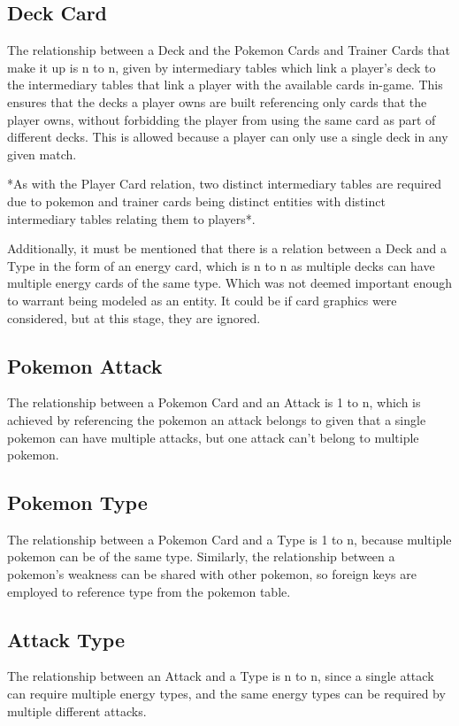 \documentclass{article}
\begin{document}
\subsection{Deck Card}

The relationship between a Deck and the 
Pokemon Cards and Trainer Cards that make it 
up is n to n, given by intermediary tables which link a player's deck to 
the intermediary tables that link a player with the available cards in-game. 
This ensures that the decks a player owns are built referencing only cards 
that the player owns, without forbidding the player from using the same card 
as part of different decks. This is allowed because a player can only use a 
single deck in any given match.

*As with the Player Card relation, two distinct intermediary 
tables are required due to pokemon and trainer cards being distinct 
entities with distinct intermediary tables relating them to players*.

Additionally, it must be mentioned that there is a relation between a 
Deck and a Type in the form of an energy card, which is 
n to n as multiple decks can have multiple energy cards of the same type. 
Which was not deemed important enough to warrant being modeled as an entity. 
It could be if card graphics were considered, but at this stage, they are 
ignored.

\subsection{Pokemon Attack}

The relationship between a Pokemon Card and an 
Attack is 1 to n, which is achieved by referencing the pokemon an 
attack belongs to given that a single pokemon can have multiple attacks, but 
one attack can't belong to multiple pokemon.

\subsection{Pokemon Type}

The relationship between a Pokemon Card and a Type 
is 1 to n, because multiple pokemon can be of the same type. Similarly, 
the relationship between a pokemon's weakness can be shared with other 
pokemon, so foreign keys are employed to reference type from the pokemon table.

\subsection{Attack Type}

The relationship between an Attack and a Type is n to n, 
since a single attack can require multiple energy types, and the same energy 
types can be required by multiple different attacks.
\end{document}
